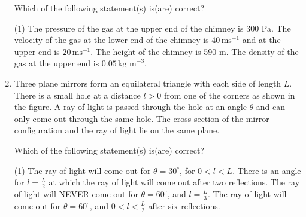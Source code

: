 \documentclass{article}
\begin{document}
\begin{enumerate}
\begin{center}
\end{center}

Which of the following statement(s) is(are) correct?

\begin{tasks}(1)
\task The pressure of the gas at the upper end of the chimney is 300 Pa.
\task The velocity of the gas at the lower end of the chimney is \( 40 \, \text{ms}^{-1} \) and at the upper end is \( 20 \, \text{ms}^{-1} \).
\task The height of the chimney is 590 m.
\task The density of the gas at the upper end is \( 0.05 \, \text{kg m}^{-3} \).
\end{tasks}

    \item Three plane mirrors form an equilateral triangle with each side of length \( L \). There is a small hole at a distance \( l > 0 \) from one of the corners as shown in the figure. A ray of light is passed through the hole at an angle \( \theta \) and can only come out through the same hole. The cross section of the mirror configuration and the ray of light lie on the same plane.

    \begin{center}
    \end{center}

    Which of the following statement(s) is(are) correct?

    \begin{tasks}(1)
    \task The ray of light will come out for \( \theta = 30^\circ \), for \( 0 < l < L \).
    \task There is an angle for \( l = \frac{L}{2} \) at which the ray of light will come out after two reflections.
    \task The ray of light will NEVER come out for \( \theta = 60^\circ \), and \( l = \frac{L}{3} \).
    \task The ray of light will come out for \( \theta = 60^\circ \), and \( 0 < l < \frac{L}{2} \) after six reflections.
    \end{tasks}


\end{enumerate}
\end{document}
